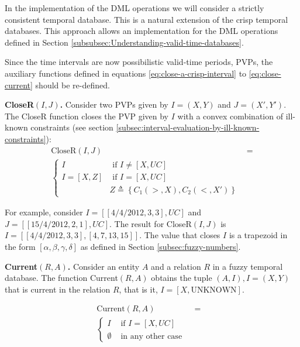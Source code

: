 In the implementation of the DML operations we will consider a strictly consistent temporal database. This is a natural extension of the crisp temporal databases. This approach allows an implementation for the DML operations defined in Section \ref{subsubsec:Understanding-valid-time-databases}.

Since the time intervals are now possibilistic valid-time periods, PVPs, the auxiliary functions defined in equations \eqref{eq:close-a-crisp-interval} to \eqref{eq:close-current} should be re-defined.

\begin{definition}
\label{def:close-r-a-pvp}
\textbf{CloseR$\left(I, J\right)$.}
Consider two PVPs given by $I = \left(X, Y \right)$ and $J = \left(X', Y' \right)$. The CloseR function closes the PVP given by $I$ with a convex combination of ill-known constraints (see section \ref{subsec:interval-evaluation-by-ill-known-constraints}):
\begin{align}
\label{eq:close-r-a-pvp}
\text{CloseR}\left(I, J\right) &= \\
\begin{cases}
\nonumber
I   & \mbox{ if } I \neq \left[X, UC \right] \\
I = \left[X, Z \right] & \mbox{ if } I = \left[X, UC \right] \\
& Z \triangleq \left \lbrace C_1\left(>, X \right), C_2\left(<, X' \right) \right \rbrace
\end{cases}
\end{align}
\end{definition}

For example, consider $I = \left[\left[4/4/2012, 3, 3\right] , UC\right]$ and $J = \left[ \left[15/4/2012,2,1\right], UC\right]$. The result for CloseR$\left(I, J\right)$  is $I = \left[ \left[4/4/2012, 3, 3\right], \left[4,7,13,15 \right] \right]$. The value that closes $I$ is a trapezoid in the form $\left[ \alpha, \beta, \gamma, \delta \right]$ as defined in Section \ref{subsec:fuzzy-numbers}.

\begin{definition}
\label{def:pvp-current-in-relation}
\textbf{Current$\left(R, A \right)$.}
Consider an entity $A$ and a relation $R$ in a fuzzy temporal database. The function Current$\left(R, A \right)$ obtains the tuple $\left(A, I \right), I = \left(X, Y \right)$ that is current in the relation $R$, that is it, $I = \left[X , \text{UNKNOWN} \right]$.

\begin{align}
\label{eq:pvp-current-in-relation}
\mbox{Current} \left(R, A \right) &=& \\ 
\begin{cases}
\nonumber
I & \mbox{ if } I = \left[X, UC \right] \\
\emptyset & \mbox{ in any other case }
\end{cases}
\end{align}
\end{definition}

